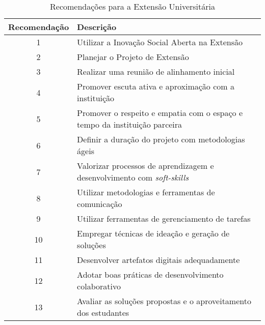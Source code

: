 \begin{table}[H]
\centering
\caption{Recomendações para a Extensão Universitária}
\begin{tabular}{|c|p{11cm}|}
\hline
\textbf{Recomendação} & \textbf{Descrição} \\ \hline
1 & Utilizar a Inovação Social Aberta na Extensão \\ \hline
2 & Planejar o Projeto de Extensão  \\ \hline
3 & Realizar uma reunião de alinhamento inicial \\ \hline
4 & Promover escuta ativa e aproximação com a instituição \\ \hline
5 & Promover o respeito e empatia com o espaço e tempo da instituição parceira  \\ \hline
6 & Definir a duração do projeto com metodologias ágeis \\ \hline
7 & Valorizar processos de aprendizagem e desenvolvimento com \textit{soft-skills} \\ \hline
8 & Utilizar metodologias e ferramentas de comunicação \\ \hline
9 & Utilizar ferramentas de gerenciamento de tarefas \\ \hline
10 & Empregar técnicas de ideação e geração de soluções \\ \hline
11 & Desenvolver artefatos digitais adequadamente \\ \hline
12 & Adotar boas práticas de desenvolvimento colaborativo \\ \hline
13 & Avaliar as soluções propostas e o aproveitamento dos estudantes \\ \hline
\end{tabular}
\end{table}
